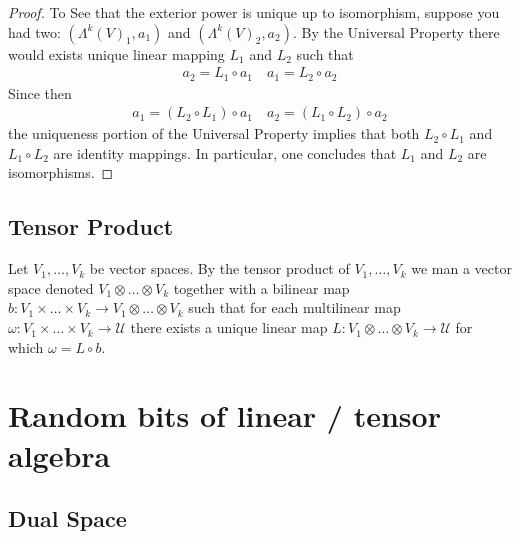 \documentclass[12pt]{armath}
\newcommand{\U}{\mathcal{U}}
\newcommand{\ra}{\rightarrow}
\begin{document}
\begin{proof}
    To See that the exterior power is unique up to isomorphism, suppose you had
    two: $(\Lambda^k(V)_1,a_1)$ and $(\Lambda^k(V)_2,a_2)$. By the Universal
    Property there would exists unique linear mapping $L_1$ and $L_2$ such that
    \begin{align*}
      a_2=L_1\circ a_1\quad a_1=L_2\circ a_2
    \end{align*}
    Since then
    \begin{align*}
      a_1=(L_2\circ L_1)\circ a_1\quad a_2=(L_1\circ L_2)\circ a_2
    \end{align*}
    the uniqueness portion of the Universal Property implies that both $L_2\circ
    L_1$ and $L_1\circ L_2$ are identity mappings. In particular, one concludes
    that $L_1$ and $L_2$ are isomorphisms.
  \end{proof}

  \subsection{Tensor Product}%
  \label{sub:tensor_product}

  \begin{center}
  \end{center}

  Let $V_1,\ldots,V_k$ be vector spaces. By the tensor product of
  $V_1,\ldots,V_k$ we man a vector space denoted $V_1\otimes\ldots\otimes V_k$
  together with a bilinear map $b:V_1\times\ldots\times V_k\ra
  V_1\otimes\ldots\otimes V_k$ such that for each multilinear map
  $\omega:V_1\times\ldots\times V_k\ra\U$ there exists a unique linear map
  $L:V_1\otimes\ldots\otimes V_k\ra\U$ for which $\omega=L\circ b$.

  \section{Random bits of linear / tensor algebra}%
  \label{sec:random_bits_of_linear_tensor_algebra}

  \subsection{Dual Space}%
  \label{sub:dual_space}
\end{document}
